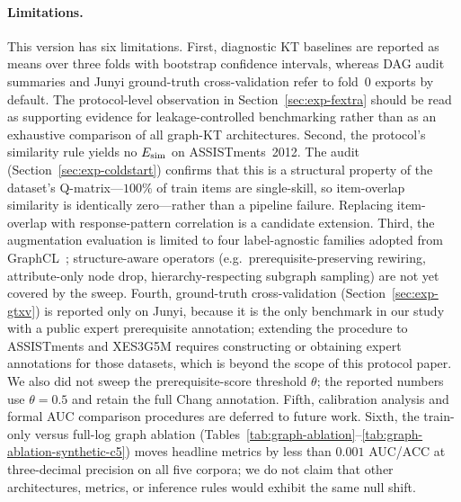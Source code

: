 \paragraph{Limitations.}
This version has six limitations.
First, diagnostic KT baselines are reported as means over three folds
with bootstrap confidence intervals, whereas DAG audit summaries and
Junyi ground-truth cross-validation refer to fold~0 exports by default.
The protocol-level observation in Section~\ref{sec:exp-fextra} should be
read as supporting evidence for leakage-controlled benchmarking rather
than as an exhaustive comparison of all graph-KT architectures.
Second, the protocol's similarity rule yields no $E_{\text{sim}}$ on
ASSISTments~2012. The audit
(Section~\ref{sec:exp-coldstart}) confirms that this is a structural
property of the dataset's Q-matrix---$100\%$ of train items are
single-skill, so item-overlap similarity is identically zero---rather
than a pipeline failure. Replacing item-overlap with response-pattern
correlation is a candidate extension.
Third, the augmentation evaluation is limited to four label-agnostic
families adopted from GraphCL~\cite{you2020graphcl}; structure-aware
operators (e.g.\ prerequisite-preserving rewiring, attribute-only
node drop, hierarchy-respecting subgraph sampling) are not yet
covered by the \DDR{} sweep.
Fourth, ground-truth cross-validation
(Section~\ref{sec:exp-gtxv}) is reported only on Junyi, because it is
the only benchmark in our study with a public expert prerequisite
annotation; extending the procedure to ASSISTments and XES3G5M
requires constructing or obtaining expert annotations for those
datasets, which is beyond the scope of this protocol paper. We also
did not sweep the prerequisite-score threshold $\theta$; the reported
numbers use $\theta=0.5$ and retain the full Chang annotation.
Fifth, calibration analysis and formal AUC comparison procedures are
deferred to future work.
Sixth, the train-only versus full-log graph ablation
(Tables~\ref{tab:graph-ablation}--\ref{tab:graph-ablation-synthetic-c5}) moves headline metrics by less than
$0.001$ AUC/ACC at three-decimal precision on all five corpora; we do not
claim that other architectures, metrics, or inference rules would exhibit the
same null shift.
